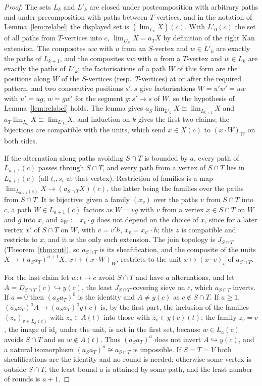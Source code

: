 \documentclass[11pt]{amsart}
\theoremstyle{definition}
\begin{document}
\begin{proof}
The sets $L_k$ and $L'_k$ are closed under postcomposition with
arbitrary paths and under precomposition with paths between
$T$-vertices, and in the notation of Lemma~\ref{lem:relabel} the
displayed set is $(\lim_{L_k}X)(c)$. With $L'_0(c)$ the set of all paths
from $T$-vertices into $c$, $\lim_{L'_0}X=a_TX$ by definition of the
right Kan extension. The composites $uw$ with $u$ from an $S$-vertex and
$w\in L'_k$ are exactly the paths of $L_{k+1}$, and the composites $uw$
with $u$ from a $T$-vertex and $w\in L_k$ are exactly the paths of
$L'_k$; the factorisations of a path $W$ of this form are the positions
along $W$ of the $S$-vertices (resp.\ $T$-vertices) at or after the
required pattern, and two consecutive positions $s',s$ give
factorisations $W=u'w'=uw$ with $u'=ug$, $w=gw'$ for the segment
$g\colon s'\to s$ of $W$, so the hypothesis of Lemma~\ref{lem:relabel}
holds. The lemma gives $a_S\lim_{L'_k}X\cong\lim_{L_{k+1}}X$ and
$a_T\lim_{L_k}X\cong\lim_{L'_k}X$, and induction on $k$ gives the first
two claims; the bijections are compatible with the units, which send
$x\in X(c)$ to $(x\cdot W)_W$ on both sides.

If the alternation along paths avoiding $S\cap T$ is bounded by $a$,
every path of $L_{a+1}(c)$ passes through $S\cap T$, and every path from
a vertex of $S\cap T$ lies in $L_{a+1}(c)$ (all $t_i,s_i$ at that
vertex). Restriction of families is a map $\lim_{L_{a+1}(c)}X\to
(a_{S\cap T}X)(c)$, the latter being the families over the paths from
$S\cap T$. It is bijective: given a family $(x_v)$ over the paths $v$
from $S\cap T$ into $c$, a path $W\in L_{a+1}(c)$ factors as $W=vg$ with
$v$ from a vertex $x\in S\cap T$ on $W$ and $g$ into $x$, and
$z_W:=x_v\cdot g$ does not depend on the choice of $x$, since for a
later vertex $x'$ of $S\cap T$ on $W$, with $v=v'h$, $x_v=x_{v'}\cdot h$;
this $z$ is compatible and restricts to $x$, and it is the only such
extension. The join topology is $J_{S\cap T}$
(Theorem~\ref{thm:cut}), so $a_{S\cap T}$ is its sheafification, and the
composite of the units $X\to(a_Sa_T)^{a+1}X$, $x\mapsto(x\cdot W)_W$,
restricts to the unit $x\mapsto(x\cdot v)_v$ of $a_{S\cap T}$.

For the last claim let $w\colon t\to c$ avoid $S\cap T$ and have $a$
alternations, and let $A=D_{S\cap T}(c)\hookrightarrow y(c)$, the least
$J_{S\cap T}$-covering sieve on $c$, which $a_{S\cap T}$ inverts. If
$a=0$ then $(a_Sa_T)^0$ is the identity and $A\ne y(c)$ as $c\notin
S\cap T$. If $a\ge1$, $(a_Sa_T)^aA\to(a_Sa_T)^ay(c)$ is, by the first
part, the inclusion of the families $(z_v)_{v\in L_a(c)}$ with $z_v\in
A(t)$ into those with $z_v\in y(c)(t)$; the family $z_v=v$, the image of
$\mathrm{id}_c$ under the unit, is not in the first set, because $w\in
L_a(c)$ avoids $S\cap T$ and so $w\notin A(t)$. Thus $(a_Sa_T)^a$ does
not invert $A\hookrightarrow y(c)$, and a natural isomorphism
$(a_Sa_T)^a\cong a_{S\cap T}$ is impossible. If $S=T=V$ both
sheafifications are the identity and no round is needed; otherwise some
vertex is outside $S\cap T$, the least bound $a$ is attained by some
path, and the least number of rounds is $a+1$.
\end{proof}
\end{document}
